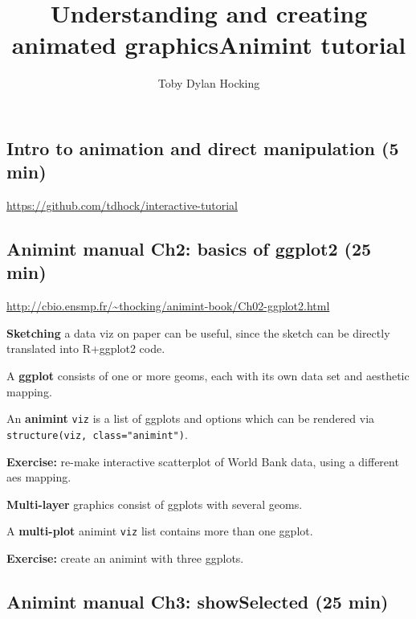 \documentclass{article}
\begin{document}
\title{Understanding and creating animated graphicsAnimint tutorial}
\author{Toby Dylan Hocking}
\maketitle
\thispagestyle{empty}

\subsection*{Intro to animation and direct manipulation (5 min)}

\url{https://github.com/tdhock/interactive-tutorial}

\subsection*{Animint manual Ch2: basics of ggplot2 (25 min)}

\url{http://cbio.ensmp.fr/~thocking/animint-book/Ch02-ggplot2.html}

\hrulefill

\textbf{Sketching} a data viz on paper can be useful, since the sketch
can be directly translated into R+ggplot2 code.

A \textbf{ggplot} consists of one or more geoms, each with its own
data set and aesthetic mapping.

An \textbf{animint} \texttt{viz} is a list of ggplots and options
which can be rendered via \verb|structure(viz, class="animint")|.

\textbf{Exercise:} re-make interactive scatterplot of World Bank data,
using a different aes mapping.

\hrulefill


\textbf{Multi-layer} graphics consist of ggplots with several geoms.

A \textbf{multi-plot} animint \texttt{viz} list contains more than one
ggplot.

\textbf{Exercise:} create an animint with three ggplots.

\subsection*{Animint manual Ch3: showSelected (25 min)}
\end{document}
